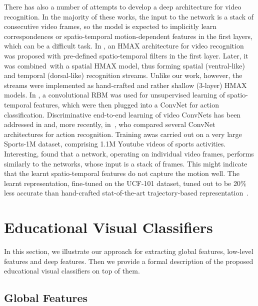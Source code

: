 \documentclass[11pt,twocolumn,twoside]{IEEEtran}
\begin{document}
There has also a number of attempts to develop a deep architecture for video recognition. In the majority of these works, the input to the network is a stack of consecutive video
frames, so the model is expected to implicitly learn correspondences or spatio-temporal motion-dependent features in the first layers, which can be a difficult task.
In \cite{huang07}, an HMAX architecture for video recognition was proposed with pre-defined spatio-temporal filters in the first layer. Later, it was combined~\cite{HMDB}with a
spatial HMAX model, thus forming spatial (ventral-like) and temporal (dorsal-like) recognition streams. Unlike our work, however, the streams were implemented as hand-crafted and rather shallow (3-layer) HMAX models. In \cite{Fergus10}, a convolutional RBM was used for unsupervised learning of spatio-temporal features, which were then plugged into a ConvNet for action classification. Discriminative end-to-end learning of video ConvNets has been addressed in \cite{Kaiyu13} and, more recently, in~\cite{CVPR14}, who compared several
ConvNet architectures for action recognition. Training awas carried out on a very large Sports-1M dataset, comprising 1.1M Youtube videos of sports activities. Interesting, \cite{CVPR14} found that a network, operating on individual video frames, performs similarly to the networks, whose input is a stack of frames. This might indicate that the learnt spatio-temporal features do not capture the motion well. The learnt representation, fine-tuned on the UCF-101 dataset, tuned out to be 20\% less accurate than hand-crafted stat-of-the-art trajectory-based representation~\cite{Early_Fusion}.

\section{Educational Visual Classifiers}
In this section, we illustrate our approach for extracting global features, low-level features and deep features. Then we provide a formal description of the proposed educational visual classifiers on top of them.

\subsection{Global Features}\label{subsec1}
\end{document}
